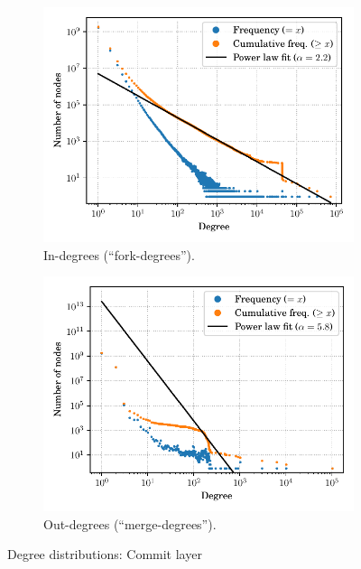 \begin{figure}
    \begin{subfigure}{.49\textwidth}
        \centering
        \includegraphics[width=\linewidth]{img/topology/inout/rev_in}
        \caption{In-degrees (``fork-degrees'').}
        \label{fig:inout_in_rev}
    \end{subfigure}\hfill%
    \begin{subfigure}{.49\textwidth}
        \centering%
        \includegraphics[width=\linewidth]{img/topology/inout/rev_out}
        \caption{Out-degrees (``merge-degrees'').}
        \label{fig:inout_out_rev}
    \end{subfigure}
    \caption{Degree distributions: Commit layer}
    \label{fig:inout_rev}
\end{figure}


